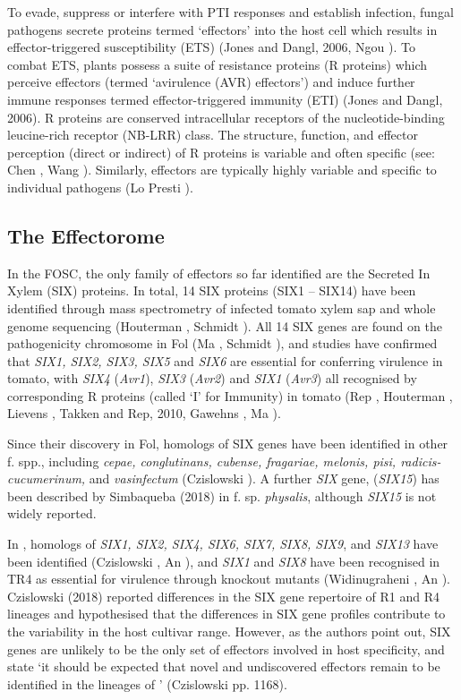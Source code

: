 To evade, suppress or interfere with PTI responses and establish infection, fungal pathogens secrete proteins termed ‘effectors’ into the host cell which results in effector-triggered susceptibility (ETS) (Jones and Dangl, 2006, Ngou ). To combat ETS, plants possess a suite of resistance proteins (R proteins) which perceive effectors (termed ‘avirulence (AVR) effectors’) and induce further immune responses termed effector-triggered immunity (ETI) (Jones and Dangl, 2006). R proteins are conserved intracellular receptors of the nucleotide-binding leucine-rich receptor (NB-LRR) class. The structure, function, and effector perception (direct or indirect) of R proteins is variable and often specific (see: Chen , Wang ). Similarly, effectors are typically highly variable and specific to individual pathogens (Lo Presti ).  


\subsection{The \Fo Effectorome}

In the FOSC, the only family of effectors so far identified are the Secreted In Xylem (SIX) proteins. In total, 14 SIX proteins (SIX1 – SIX14) have been identified through mass spectrometry of infected tomato xylem sap and whole genome sequencing (Houterman , Schmidt ).  All 14 SIX genes are found on the pathogenicity chromosome in Fol (Ma , Schmidt ), and studies have confirmed that \textit{SIX1, SIX2, SIX3, SIX5} and \textit{SIX6} are essential for conferring virulence in tomato, with  \textit{SIX4} (\textit{Avr1}), \textit{SIX3} (\textit{Avr2}) and \textit{SIX1} (\textit{Avr3}) all recognised by corresponding R proteins (called ‘I’ for Immunity) in tomato (Rep , Houterman , Lievens , Takken and Rep, 2010, Gawehns , Ma ).  

Since their discovery in Fol, homologs of SIX genes have been identified in other f. spp., including \textit{cepae, conglutinans, cubense, fragariae, melonis, pisi, radicis-cucumerinum,} and \textit{vasinfectum} (Czislowski ). A further \textit{SIX} gene, (\textit{SIX15}) has been described by Simbaqueba \et (2018) in \Fo f. sp. \textit{physalis}, although \textit{SIX15} is not widely reported.  

In \Foc, homologs of \textit{SIX1, SIX2, SIX4, SIX6, SIX7, SIX8, SIX9}, and \textit{SIX13} have been identified (Czislowski , An ), and \textit{SIX1} and \textit{SIX8} have been recognised in \Foc TR4 as essential for virulence through knockout mutants (Widinugraheni , An ). Czislowski \et (2018) reported differences in the SIX gene repertoire of \Foc R1 and R4 lineages and hypothesised that the differences in SIX gene profiles contribute to the variability in the \Foc host cultivar range.  However, as the authors point out, SIX genes are unlikely to be the only set of effectors involved in host specificity, and state ‘it should be expected that novel and undiscovered effectors remain to be identified in the lineages of \Foc’ (Czislowski  pp. 1168).  


